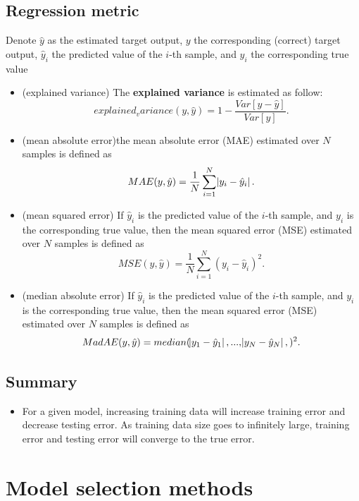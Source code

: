 \begin{refsection}
\begin{definition}
	
	
\end{definition}




\subsection{Regression metric}

\begin{definition}
Denote $\hat{y}$ as the estimated target output, $y$ the corresponding (correct) target output, $\hat{y}_i$  the predicted value of the $i$-th sample, and $y_i$ the corresponding true value
\begin{itemize}
	\item (explained variance) The \textbf{explained variance} is estimated as follow:	
	$$explained_variance(y,\hat{y}) = 1 - \frac{Var[y-\hat{y}]}{Var[y]}.$$
	\item (mean absolute error)the mean absolute error (MAE) estimated over $N$ samples is defined as	
	$$MAE(y,\hat{y}) = \frac{1}{N}\sum_{i=1}^{N} \abs{y_i - \hat{y}_i}.$$
	\item (mean squared error) If $\hat{y}_i$ is the predicted value of the $i$-th sample, and $y_i$ is the corresponding true value, then the mean squared error (MSE) estimated over $N$ samples is defined as	
	$$MSE(y,\hat{y}) = \frac{1}{N}\sum_{i=1}^{N} (y_i - \hat{y}_i)^2.$$
	\item (median absolute error) If $\hat{y}_i$ is the predicted value of the $i$-th sample, and $y_i$ is the corresponding true value, then the mean squared error (MSE) estimated over $N$ samples is defined as	
	$$MadAE(y,\hat{y}) = median(\abs{y_1 - \hat{y}_1},...,\abs{y_N - \hat{y}_N},)^2.$$
\end{itemize}	
\end{definition}

\subsection{Summary}

\begin{itemize}
	\item For a given model, increasing training data will increase training error and decrease testing error. As training data size goes to infinitely large, training error and testing error will converge to the true error.
\end{itemize}


\section{Model selection methods}


\end{refsection}
